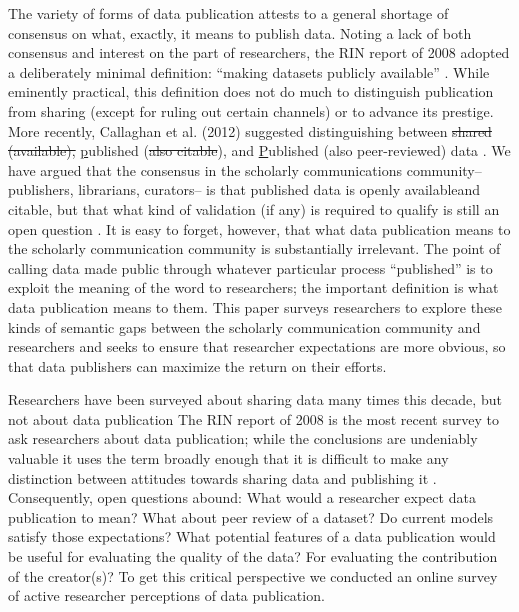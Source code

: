 \documentclass[10pt]{article}
\providecommand{\DIFaddtex}[1]{{\protect\color{blue}\uwave{#1}}} %
\providecommand{\DIFdeltex}[1]{{\protect\color{red}\sout{#1}}}                      %
\providecommand{\DIFaddbegin}{} %
\providecommand{\DIFaddend}{} %
\providecommand{\DIFdelbegin}{} %
\providecommand{\DIFdelend}{} %
\providecommand{\DIFadd}[1]{\texorpdfstring{\DIFaddtex{#1}}{#1}} %
\providecommand{\DIFdel}[1]{\texorpdfstring{\DIFdeltex{#1}}{}} %
\begin{document}
The variety of forms of data publication attests to a general shortage of consensus on what, exactly, it means to publish data.
Noting a lack of both consensus and interest on the part of researchers, the RIN report of 2008 adopted a deliberately minimal definition: ``making datasets publicly available'' \cite{swan_share_2008}.
While eminently practical, this definition does not do much to distinguish publication from sharing (except for ruling out certain channels) or to advance its prestige.
More recently, Callaghan et al. (2012) suggested distinguishing between \DIFdelbegin \DIFdel{shared (available), }\DIFdelend \underline{p}ublished (\DIFdelbegin \DIFdel{also citable}\DIFdelend \DIFaddbegin \DIFadd{available}\DIFaddend ), and \underline{P}ublished (also \DIFaddbegin \DIFadd{citable and }\DIFaddend peer-reviewed) data \cite{callaghan_making_2012}.
We have argued that the consensus in the scholarly communications community-- publishers, librarians, curators-- is that published data is openly available\DIFaddbegin \DIFadd{, documented, }\DIFaddend and citable, but that what kind of validation (if any) is required to qualify is still an open question \cite{kratz_data_2014}.
It is easy to forget, however, that what data publication means to the scholarly communication community is substantially irrelevant.
The point of calling data made public through whatever particular process ``published'' is to exploit the meaning of the word to researchers; the important definition is what data publication means to them. 
This paper surveys researchers to explore these kinds of semantic gaps between the scholarly communication community and researchers and seeks to ensure that researcher expectations are more obvious, so that data publishers can maximize the return on their efforts.  

Researchers have been surveyed about sharing data many times this decade, but not about data publication \cite{harley_assessing_2010, westra_data_2010, tenopir_data_2011, kim_institutional_2012, scaramozzino_study_2012, williams_gathering_2013, bobrow_establishing_2014, strasser_dataup:_2014}
The RIN report of 2008 is the most recent survey to ask researchers about data publication; while the conclusions are undeniably valuable it uses the term broadly enough that it is difficult to make any distinction between attitudes towards sharing data and publishing it \cite{swan_share_2008}.
Consequently, open questions abound:
What would a researcher expect data publication to mean?
What about peer review of a dataset?
Do current models satisfy those expectations?
What potential features of a data publication would be useful for evaluating the quality of the data?
For evaluating the contribution of the creator(s)?
To get this critical perspective we conducted an online survey of active researcher perceptions of data publication.
\end{document}
